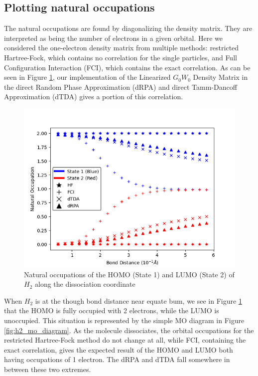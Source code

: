 \documentclass[12pt]{caltech_thesis}
\begin{document}
\subsection{Plotting natural occupations}
The natural occupations are found by diagonalizing the density matrix. They are interpreted as being the number of electrons in a given orbital.\autocite{szabo_modern_2012} Here we considered the one-electron density matrix from multiple methods: restricted Hartree-Fock, which contains no correlation for the single particles, and Full Configuration Interaction (FCI), which contains the exact correlation. As can be seen in Figure \ref{fig:h2_dissociation}, our implementation of the Linearized $G_0W_0$ Density Matrix in the direct Random Phase Approximation (dRPA) and direct Tamm-Dancoff Approximation (dTDA) gives a portion of this correlation.
\begin{figure}[h]
    \centering
    \includegraphics[width=\textwidth]{h2_occupations.png}
\caption{Natural occupations of the HOMO (State 1) and LUMO (State 2) of $H_2$ along the dissociation coordinate}
\label{fig:h2_dissociation}
\end{figure}
When $H_2$ is at the though bond distance near equate bum, we see in Figure \ref{fig:h2_dissociation} that the HOMO is fully occupied with 2 electrons, while the LUMO is unoccupied. This situation is represented by the simple MO diagram in Figure \ref{fig:h2_mo_diagram}. As the molecule dissociates, the orbital occupations for the restricted Hartree-Fock method do not change at all, while FCI, containing the exact correlation, gives the expected result of the HOMO and LUMO both having occupations of 1 electron. The dRPA and dTDA fall somewhere in between these two extremes.
\end{document}
